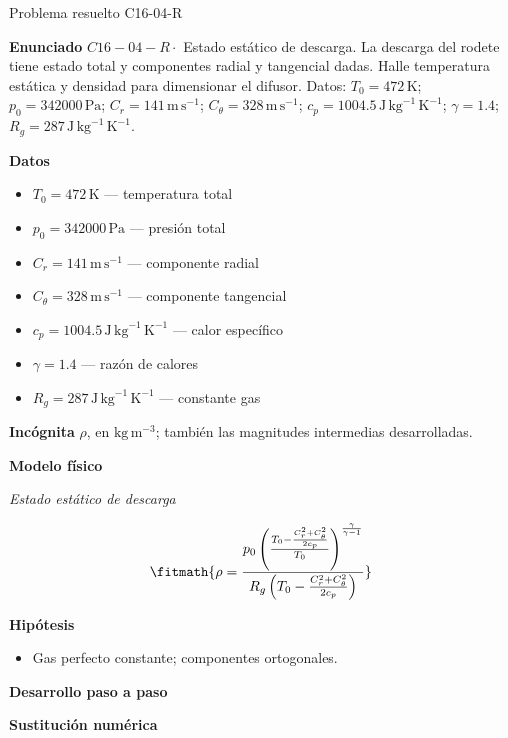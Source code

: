 \documentclass[10pt,openany]{book}
\begin{document}
\begin{studiumworked}{Problema resuelto C16-04-R}


\noindent\textbf{Enunciado}
\(C16-04-R \cdot\) Estado estático de descarga. La descarga del rodete tiene estado total y componentes radial y tangencial dadas. Halle temperatura estática y densidad para dimensionar el difusor. Datos: \(T_0=472\, \mathrm{K}\); \(p_0=342000\, \mathrm{Pa}\); \(C_r=141\, \mathrm{m}\,\mathrm{s}^{-1}\); \(C_\theta=328\, \mathrm{m}\,\mathrm{s}^{-1}\); \(c_p=1004.5\, \mathrm{J}\,\mathrm{kg}^{-1}\,\mathrm{K}^{-1}\); \(\gamma=1.4\); \(R_g=287\, \mathrm{J}\,\mathrm{kg}^{-1}\,\mathrm{K}^{-1}\).

\noindent\textbf{Datos}
\begin{itemize}
\item $T_0 = 472\,\mathrm{K}$ — temperatura total
\item $p_0 = 342000\,\mathrm{Pa}$ — presión total
\item $C_r = 141\,\mathrm{m}\,\mathrm{s}^{-1}$ — componente radial
\item $C_\theta = 328\,\mathrm{m}\,\mathrm{s}^{-1}$ — componente tangencial
\item $c_p = 1004.5\,\mathrm{J}\,\mathrm{kg}^{-1}\,\mathrm{K}^{-1}$ — calor específico
\item $\gamma = 1.4$ — razón de calores
\item $R_g = 287\,\mathrm{J}\,\mathrm{kg}^{-1}\,\mathrm{K}^{-1}$ — constante gas
\end{itemize}

\noindent\textbf{Incógnita}
$\rho$, en $\mathrm{kg\,m^{-3}}$; también las magnitudes intermedias desarrolladas.

\noindent\textbf{Modelo físico}

\noindent\textit{Estado estático de descarga}

\[
\fitmath{\rho=\frac{p_0 \left(\frac{T_0 - \frac{C_r^{2} + C_\theta^{2}}{2 c_p}}{T_0}\right)^{\frac{\gamma}{\gamma - 1}}}{R_g \left(T_0 - \frac{C_r^{2} + C_\theta^{2}}{2 c_p}\right)}}
\]

\noindent\textbf{Hipótesis}
\begin{itemize}
\item Gas perfecto constante; componentes ortogonales.
\end{itemize}

\noindent\textbf{Desarrollo paso a paso}



\noindent\textbf{Sustitución numérica}


\end{studiumworked}
\end{document}
